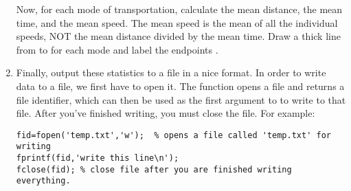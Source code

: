 \documentclass[letterpaper]{article}
\begin{document}
\begin{enumerate}

Now, for each mode of transportation, calculate the mean distance, the mean time, and the mean speed. The mean speed is the mean of all the individual speeds, NOT the mean distance divided by the mean time. Draw a thick line
from  to  for each
mode and label the endpoints .


\item Finally, output these statistics to a file in a nice format.
In order to write data to a file, we first have to open it. The function  opens
a file and returns a file identifier, which can then be used as the first argument to 
to write to that file.  
After you've finished writing, you must close the file. For example:
\begin{lstlisting}
fid=fopen('temp.txt','w');  % opens a file called 'temp.txt' for writing
fprintf(fid,'write this line\n');
fclose(fid); % close file after you are finished writing everything.
\end{lstlisting}


\end{enumerate}
\end{document}

